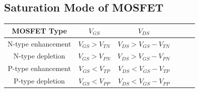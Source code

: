 \subsection{Saturation Mode of MOSFET}

\begin{table}[htbp]
  \centering
  \begin{tabular}{|Sc|Sc|Sc|}
    \hline
    MOSFET Type & $V_{GS}$ & $V_{DS}$ \\
    \hline
    N-type enhancement & $V_{GS} > V_{TN}$ & $V_{DS} > V_{GS} - V_{TN}$ \\
    \hline
    N-type depletion & $V_{GS} > V_{PN}$ & $V_{DS} > V_{GS} - V_{PN}$ \\
    \hline
    P-type enhancement & $V_{GS} < V_{TP}$ & $V_{DS} < V_{GS} - V_{TP}$ \\
    \hline
    P-type depletion & $V_{GS} < V_{PP}$ & $V_{DS} < V_{GS} - V_{PP}$ \\
    \hline
  \end{tabular}
\end{table}

